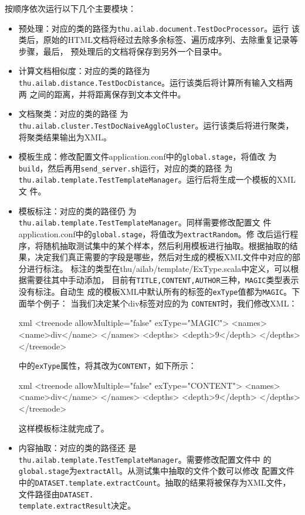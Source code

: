 \documentclass{article}
\begin{document}
按顺序依次运行以下几个主要模块：
\begin{itemize}
\item 预处理：对应的类的路径为\texttt{thu.ailab.document.TestDocProcessor}。运行
  该类后，原始的HTML文档将经过去除多余标签、遍历成序列、去除重复记录等步骤，最后，
  预处理后的文档将保存到另外一个目录中。
\item 计算文档相似度：对应的类的路径为
  \texttt{thu.ailab.distance.TestDocDistance}。运行该类后将计算所有输入文档两两
  之间的距离，并将距离保存到文本文件中。
\item 文档聚类：对应的类的路径
  为\texttt{thu.ailab.cluster.TestDocNaiveAggloCluster}。运行该类后将进行聚类，
  将聚类结果输出为XML。
\item 模板生成：修改配置文件application.conf中的\texttt{global.stage}，将值改
  为\texttt{build}，然后再用\texttt{send\_server.sh}运行，对应的类的路径
  为\texttt{thu.ailab.template.TestTemplateManager}。运行后将生成一个模板的XML文
  件。
\item 模板标注：对应的类的路径仍
  为\texttt{thu.ailab.template.TestTemplateManager}。同样需要修改配置文
  件application.conf中的\texttt{global.stage}，将值改为\texttt{extractRandom}。修
  改后运行程序，将随机抽取测试集中的某个样本，然后利用模板进行抽取。根据抽取的结
  果，决定我们真正需要的字段是哪些，然后对生成的模板XML文件中对应的部分进行标注。
  标注的类型在thu/ailab/template/ExType.scala中定义，可以根据需要往其中手动添加，
  目前有\texttt{TITLE,CONTENT,AUTHOR}三种，\texttt{MAGIC}类型表示没有标注。自动生
  成的模板XML中默认所有的标签的\texttt{exType}值都为\texttt{MAGIC}。下面举个例子：
  当我们决定某个div标签对应的为
  \texttt{CONTENT}时，我们修改XML：\\
  \begin{code}{xml}
<treenode allowMultiple="false" exType="MAGIC">
      <names>
      <name>div</name>
      </names>
      <depths>
      <depth>9</depth>
      </depths>
</treenode>    
  \end{code}
  中的\texttt{exType}属性，将其改为\texttt{CONTENT}，如下所示：\\
  \begin{code}{xml}
<treenode allowMultiple="false" exType="CONTENT">
    <names>
    <name>div</name>
    </names>
    <depths>
    <depth>9</depth>
    </depths>
</treenode>
  \end{code}

  这样模板标注就完成了。
\item 内容抽取：对应的类的路径还
  是\texttt{thu.ailab.template.TestTemplateManager}。需要修改配置文件中
  的\texttt{global.stage}为\texttt{extractAll}。从测试集中抽取的文件个数可以修改
  配置文件中的\texttt{DATASET.template.extractCount}。抽取的结果将被保存为XML文件，
  文件路径由\texttt{DATASET.\\template.extractResult}决定。
\end{itemize}
\end{document}
